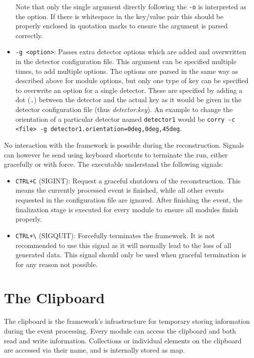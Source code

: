 \begin{itemize}
\begin{itemize}
\end{itemize}
Note that only the single argument directly following the \texttt{-o} is interpreted as the option. If there is whitespace in the key/value pair this should be properly enclosed in quotation marks to ensure the argument is parsed correctly.
\item \texttt{-g <option>}: Passes extra detector options which are added and overwritten in the detector configuration file.
This argument can be specified multiple times, to add multiple options.
The options are parsed in the same way as described above for module options, but only one type of key can be specified to overwrite an option for a single detector.
These are specified by adding a dot (\texttt{.}) between the detector and the actual key as it would be given in the detector configuration file (thus \textit{detector}.\textit{key}). An example to change the orientation of a particular detector named \texttt{detector1} would be \texttt{corry -c <file> -g detector1.orientation=0deg,0deg,45deg}.
\end{itemize}

No interaction with the framework is possible during the reconstruction. Signals can however be send using keyboard shortcuts to terminate the run, either gracefully or with force. The executable understand the following signals:
\begin{itemize}
\item \texttt{CTRL+C} (SIGINT): Request a graceful shutdown of the reconstruction. This means the currently processed event is finished, while all other events requested in the configuration file are ignored. After finishing the event, the finalization stage is executed for every module to ensure all modules finish properly.
\item \texttt{CTRL+\textbackslash} (SIGQUIT): Forcefully terminates the framework. It is not recommended to use this signal as it will normally lead to the loss of all generated data. This signal should only be used when graceful termination is for any reason not possible.
\end{itemize}

\section{The Clipboard}

The clipboard is the framework's infrastructure for temporary storing information during the event processing.
Every module can access the clipboard and both read and write information.
Collections or individual elements on the clipboard are accessed via their name, and is internally stored as map.

